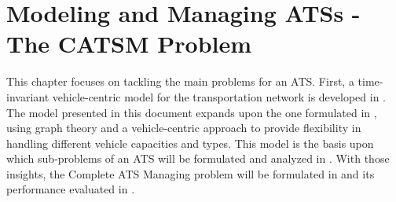\chapter{Modeling and Managing ATSs - The CATSM Problem}\label{ch:tim_ats}
This chapter focuses on tackling the main problems for an ATS. First, a time-invariant vehicle-centric model for the transportation network is developed in . The model presented in this document expands upon the one formulated in \cite{project_thesis}, using graph theory and a vehicle-centric approach to provide flexibility in handling different vehicle capacities and types. This model is the basis upon which sub-problems of an ATS will be formulated and analyzed in . With those insights, the Complete ATS Managing problem will be formulated in  and its performance evaluated in . 
